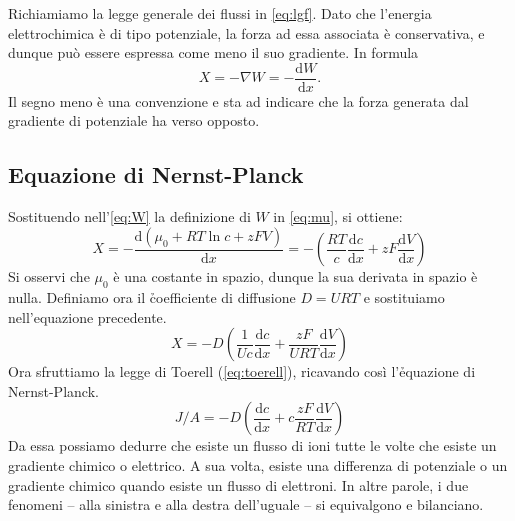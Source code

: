 Richiamiamo la legge generale dei flussi in \autoref{eq:lgf}. Dato che l'energia elettrochimica è di tipo potenziale, la forza ad essa associata è conservativa, e dunque può essere espressa come meno il suo gradiente. In formula
\begin{equation}
    \label{eq:W}
    X = -\nabla W = -\frac{\mathrm{d}W}{\mathrm{d}x}.
\end{equation}
Il segno meno è una convenzione e sta ad indicare che la forza generata dal gradiente di potenziale ha verso opposto.

\subsection{Equazione di Nernst-Planck}
Sostituendo nell'\autoref{eq:W} la definizione di $W$ in \autoref{eq:mu}, si ottiene:
\begin{equation*}
    X = - \frac{\mathrm{d}(\mu_0 + RT \ln{c} + zFV)}{\mathrm{d}x} = - \left( \frac{RT}{c} \frac{\mathrm{d}c}{\mathrm{d}x} + zF \frac{\mathrm{d}V}{\mathrm{d}x} \right)
\end{equation*}
Si osservi che $\mu_0$ è una costante in spazio, dunque la sua derivata in spazio è nulla. Definiamo ora il \h{coefficiente di diffusione} $D = U RT$ e sostituiamo nell'equazione precedente.
\begin{equation*}
    X = - D \left( \frac{1}{U c} \frac{\mathrm{d}c}{\mathrm{d}x} +\frac{zF}{URT} \frac{\mathrm{d}V}{\mathrm{d}x} \right)
\end{equation*}
Ora sfruttiamo la legge di Toerell (\autoref{eq:toerell}), ricavando così l'\h{equazione di Nernst-Planck}.
\begin{equation}
    \label{eq:np}
    \boxed{J / A = - D \left( \frac{\mathrm{d}c}{\mathrm{d}x} +c \frac{z F}{RT} \frac{\mathrm{d}V}{\mathrm{d}x}  \right)}
\end{equation}
Da essa possiamo dedurre che esiste un flusso di ioni tutte le volte che esiste un gradiente chimico o elettrico. A sua volta, esiste una differenza di potenziale o un gradiente chimico quando esiste un flusso di elettroni. In altre parole, i due fenomeni -- alla sinistra e alla destra dell'uguale -- si equivalgono e bilanciano.

